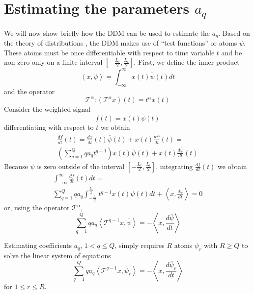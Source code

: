 \documentclass[twoside,a4paper]{article}
\begin{document}
\section{Estimating the parameters \lowercase{$a_{q}$}}
\label{sec:estimating_aj}
We will now show briefly how the DDM can be used to estimate the $a_{q}$. Based on
the theory of distributions \cite{schwartz1959theorie}, the DDM
makes use of ``test
functions'' or atoms $\psi$. These atoms must be once differentiable with
respect to time variable $t$ and be non-zero only on a finite interval
$[-\frac{L_{t}}{2},\frac{L_{t}}{2}]$. First, we define the inner product
%
\begin{equation}
    \label{eq:ddm:inner:prod:def}
    \left\langle x , \psi \right\rangle = 
    \int_{-\infty}^{\infty}x(t)\overline{\psi}(t)dt
\end{equation}
%
and the operator 
%
\begin{equation}
\mathcal{T}^{\alpha} : (\mathcal{T}^{\alpha}x)(t) = t^{\alpha}x(t)
\end{equation}
%
Consider the weighted signal
%
\begin{equation}
    f(t) = x(t) \overline{\psi}(t)
\end{equation}
%
differentiating with respect to $t$ we obtain
%
\begin{multline}
    \label{eq:ddm:weighted:sig:derivative}
    \frac{df}{dt}(t) = 
    \frac{dx}{dt}(t)\overline{\psi}(t)
    + x(t)\frac{d\overline{\psi}}{dt}(t) = \\
    \left( \sum_{q=1}^{Q} q a_{q} t^{q-1} \right) x(t)\overline{\psi}(t)
    + x(t)\frac{d\overline{\psi}}{dt}(t)
\end{multline}
%
Because $\psi$ is zero outside of the interval $[-\frac{L_{t}}{2},\frac{L_{t}}{2}]$, integrating
$\frac{df}{dt}(t)$ we obtain
%
\begin{multline}
    \int_{-\infty}^{\infty}\frac{df}{dt}(t)dt = \\
    \sum_{q=1}^{Q} q a_{q} \int_{-\frac{L_{t}}{2}}^{\frac{L_{t}}{2}} t^{q-1} x(t) \overline{\psi}(t) dt
    + \left\langle x, \frac{d\overline{\psi}}{dt} \right\rangle = 0
\end{multline}
%
or, using the operator $\mathcal{T}^{\alpha}$,
%
\begin{equation} 
    \sum_{q=1}^{Q} q a_{q} 
    \left\langle \mathcal{T}^{q-1} x , \overline{\psi} \right\rangle
    = -\left\langle x, \frac{d\overline{\psi}}{dt} \right\rangle
\end{equation}
%

Estimating coefficients $a_{q}$, ${1 < q \leq Q}$, simply requires $R$ atoms
$\psi_{r}$ with $R \geq Q$ to solve the linear system of equations
\begin{equation}
    \label{eq:ddmsyseq}
    \sum_{q=1}^{Q} q a_{q} 
    \left\langle \mathcal{T}^{q-1} x , \overline{\psi}_{r} \right\rangle
    = -\left\langle x, \frac{d\overline{\psi}_{r}}{dt} \right\rangle
\end{equation}
for $1 \leq r \leq R$.
\end{document}
